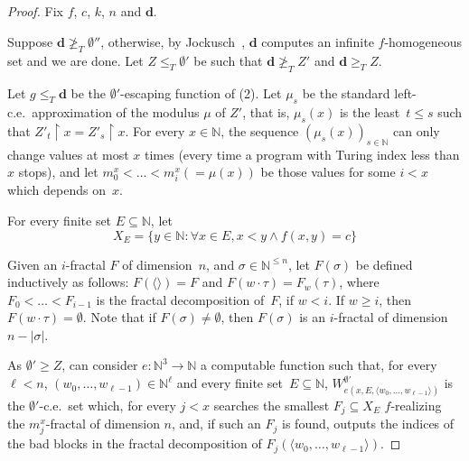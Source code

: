 \documentclass{article}
\numberwithin{theorem}{section}
\newcommand{\dbf}{\mathbf{d}}
\newcommand{\uh}{\upharpoonright}
\newcommand{\NN}[0]{\mathbb{N}}
\begin{document}
\begin{proof}
Fix $f$, $c$, $k$, $n$ and $\dbf$. 

Suppose $\dbf \not \geq_T \emptyset''$, otherwise, by Jockusch~\cite[Theorem 4.2]{jockusch1972ramsey}, $\dbf$ computes an infinite $f$-homogeneous set and we are done. Let $Z \leq_T \emptyset'$ be such that $\dbf \not \geq_T Z'$ and $\dbf \geq_T Z$.

Let $g \leq_T \dbf$ be the $\emptyset'$-escaping function of (2). Let $\mu_s$ be the standard left-c.e.\ approximation of the modulus $\mu$ of $Z'$, that is, $\mu_s(x)$ is the least~$t \leq s$ such that $Z'_t \uh x = Z'_s \uh x$. For every $x \in \NN$, the sequence $(\mu_s(x))_{s \in \NN}$ can only change values at most $x$ times (every time a program with Turing index less than $x$ stops), and let $m^x_0 < \dots < m^x_i (= \mu(x))$ be those values for some $i < x$ which depends on~$x$.

For every finite set $E \subseteq \NN$, let 
$$
X_E = \{y \in \NN : \forall x \in E, x < y \wedge f(x,y) = c\}
$$

Given an $i$-fractal $F$ of dimension~$n$, and $\sigma \in \NN^{\leq n}$, let $F(\sigma)$ be defined inductively as follows:
$F(\langle\rangle) = F$ and $F(w \cdot \tau) = F_w(\tau)$, where $F_0 < \dots < F_{i-1}$ is the fractal decomposition of~$F$, if $w < i$. If $w \geq i$, then $F(w \cdot \tau) = \emptyset$.
Note that if $F(\sigma) \neq \emptyset$, then $F(\sigma)$ is an $i$-fractal of dimension $n-|\sigma|$.

As $\emptyset' \geq Z$, can consider $e : \NN^3 \to \NN$ a computable function such that, for every~$\ell < n$, $(w_0, \dots, w_{\ell-1}) \in \NN^\ell$ and every finite set~$E \subseteq \NN$, $W^{\emptyset'}_{e(x, E, \langle w_0, \dots, w_{\ell-1} \rangle)}$ is the $\emptyset'$-c.e.\ set which, for every $j < x$ searches the smallest $F_j \subseteq X_E$ $f$-realizing the $m_j^x$-fractal of dimension $n$, and, if such an $F_j$ is found, outputs the indices of the bad blocks in the fractal decomposition of $F_j(\langle w_0, \dots, w_{\ell-1} \rangle)$.




\end{proof}
\end{document}
